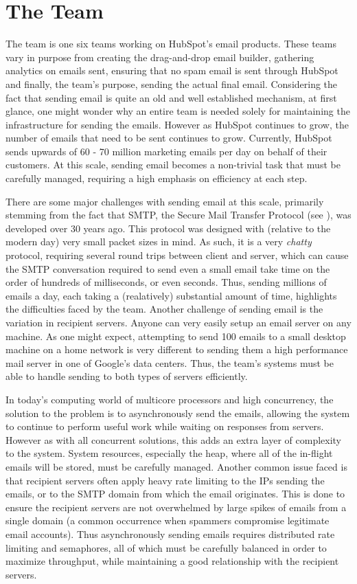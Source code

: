 \section{The \team{} Team} \label{sec:emailSendingInfra}
The \team{} team is one six teams working on HubSpot's email products. These teams vary in purpose from creating the drag-and-drop email builder, gathering analytics on emails sent, ensuring that no spam email is sent through HubSpot and finally, the \team{} team's purpose, sending the actual final email. Considering the fact that sending email is quite an old and well established mechanism, at first glance, one might wonder why an entire team is needed solely for maintaining the infrastructure for sending the emails. However as HubSpot continues to grow, the number of emails that need to be sent continues to grow. Currently, HubSpot sends upwards of 60 - 70 million marketing emails per day on behalf of their customers. At this scale, sending email becomes a non-trivial task that must be carefully managed, requiring a high emphasis on efficiency at each step. 

There are some major challenges with sending email at this scale, primarily stemming from the fact that SMTP, the Secure Mail Transfer Protocol (see ), was developed over 30 years ago. This protocol was designed with (relative to the modern day) very small packet sizes in mind. As such, it is a very \textit{chatty} protocol, requiring several round trips between client and server, which can cause the SMTP conversation required to send even a small email take time on the order of hundreds of milliseconds, or even seconds. Thus, sending millions of emails a day, each taking a (realatively) substantial amount of time, highlights the difficulties faced by the \team{} team. Another challenge of sending email is the variation in recipient servers. Anyone can very easily setup an email server on any machine. As one might expect, attempting to send 100 emails to a small desktop machine on a home network is very different to sending them a high performance mail server in one of Google's data centers. Thus, the \team{} team's systems must be able to handle sending to both types of servers efficiently. 

In today's computing world of multicore processors and high concurrency, the solution to the problem is to asynchronously send the emails, allowing the system to continue to perform useful work while waiting on responses from servers. However as with all concurrent solutions, this adds an extra layer of complexity to the system. System resources, especially the heap, where all of the in-flight emails will be stored, must be carefully managed. Another common issue faced is that recipient servers often apply heavy rate limiting to the IPs sending the emails, or to the SMTP domain from which the email originates. This is done to ensure the recipient servers are not overwhelmed by large spikes of emails from a single domain (a common occurrence when spammers compromise legitimate email accounts). Thus asynchronously sending emails requires distributed rate limiting and semaphores, all of which must be carefully balanced in order to maximize throughput, while maintaining a good relationship with the recipient servers. 

